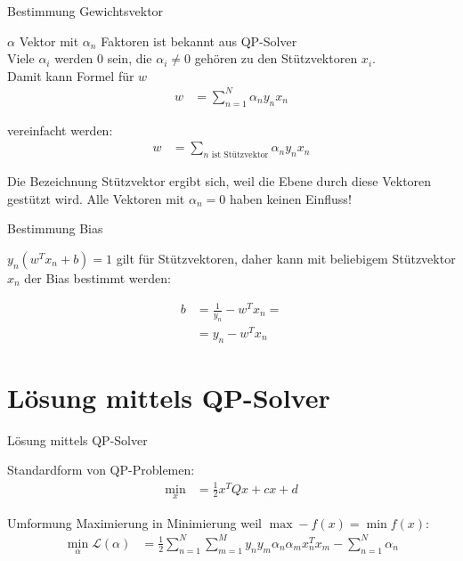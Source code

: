 \documentclass[ngerman]{beamer}
\newcommand{\Lagr}{\mathcal{L}}
\begin{document}
\begin{frame}{Bestimmung Gewichtsvektor}
	
	$\alpha$ Vektor mit $\alpha_{n}$ Faktoren ist bekannt aus QP-Solver\\
	Viele $\alpha_{i}$ werden $0$ sein, die $\alpha_{i} \neq 0$ gehören zu den Stützvektoren $x_{i}$. \\
	Damit kann Formel für $w$
	\begin{equation*}
		\begin{aligned}
			w &= \sum_{n=1}^{N} \alpha_{n} y_{n} x_{n}
		\end{aligned}
	\end{equation*}

	vereinfacht werden:
	\begin{equation*}
	\begin{aligned}
		w &= \sum_{n \text{ ist Stützvektor}} \alpha_{n} y_{n} x_{n}
	\end{aligned}
	\end{equation*}

	Die Bezeichnung Stützvektor ergibt sich, weil die Ebene durch diese Vektoren \glqq gestützt \grqq wird. Alle Vektoren mit $\alpha_{n} = 0$ haben keinen Einfluss!
\end{frame}

\begin{frame}{Bestimmung Bias}
	
	$y_n (w^{T} x_{n} + b) = 1$ gilt für Stützvektoren, daher kann mit beliebigem Stützvektor $x_{n}$ der Bias bestimmt werden:
	
	\begin{equation*}
		\begin{aligned}
			b &= \frac{1}{y_{n}} - w^{T} x_{n} = \\
			&= y_{n} - w^{T} x_{n} 
		\end{aligned}
	\end{equation*}
	
	
\end{frame}


\section{Lösung mittels QP-Solver}

\begin{frame}{Lösung mittels QP-Solver}
	
	Standardform von QP-Problemen:
	\begin{equation*} \label{std_QP_problem}
		\begin{aligned}
			\min_{x} &= \frac{1}{2} x^{T} Q x + c x + d 
		\end{aligned}
	\end{equation*}
	
	Umformung Maximierung in Minimierung weil $\max -f(x) = \min f(x)$:
	\begin{equation*} \label{qp_adapt1}
		\begin{aligned}
			\min_{\alpha} \Lagr(\alpha) &= \frac{1}{2} \sum_{n=1}^{N} \sum_{m=1}^{M} y_{n} y_{m} \alpha_{n} \alpha_{m} x_{n}^{T} x_{m} - \sum_{n=1}^{N} \alpha_{n}
		\end{aligned}
	\end{equation*}
\end{frame}
\end{document}
